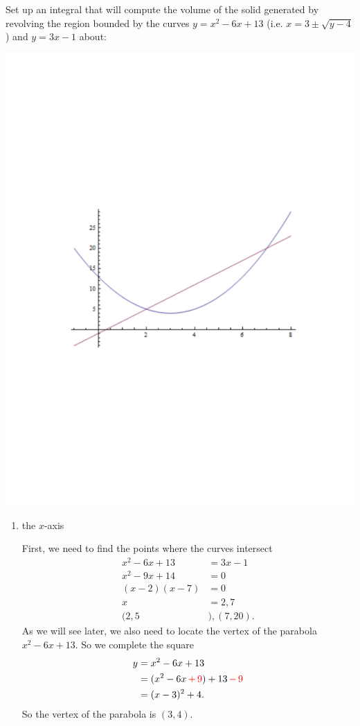 \documentclass[]{ximera}
\begin{document}
\begin{problem}
Set up an integral that will compute the volume of the solid generated by revolving the region bounded by the curves $y=x^2-6x+13$ (i.e. $x = 3 \pm \sqrt{y-4}$) and $y=3x-1$ about:

\begin{image}
\includegraphics[trim= 170 270 150 280, scale=0.8]{Figure6-4-1.pdf}
\end{image}

	\begin{enumerate}
		\item  the $x$-axis
		\begin{freeResponse}
		First, we need to find the points where the curves intersect
			\begin{align*}
			x^2 - 6x + 13 &= 3x - 1  \\
			x^2 - 9x + 14 &= 0  \\
			(x-2)(x-7) &= 0  \\
			x &= 2, 7  \\
			(2,5&), (7,20).
			\end{align*}
		As we will see later, we also need to locate the vertex of the parabola $x^2 - 6x + 13$.  
		So we complete the square
			\begin{align*}
			y &= x^2 - 6x + 13  \\
			&= (x^2 - 6x \, {\color{red} + \, 9}) + 13 \, {\color{red} - \, 9}  \\
			&= (x-3)^2 + 4.
			\end{align*}
		So the vertex of the parabola is $(3,4)$.  
		

\end{freeResponse}
\end{enumerate}
\end{problem}
\end{document}
